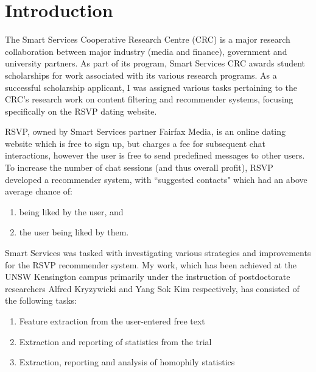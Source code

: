 \documentclass{report}
\begin{document}
\maketitle
\tableofcontents

\chapter{Introduction}

The Smart Services Cooperative Research Centre (CRC) is a major research collaboration between major industry (media and finance), government and university partners. As part of its program, Smart Services CRC awards student scholarships for work associated with its various research programs. As a successful scholarship applicant, I was assigned various tasks pertaining to the CRC's research work on content filtering and recommender systems, focusing specifically on the RSVP dating website.

RSVP, owned by Smart Services partner Fairfax Media, is an online dating website which is free to sign up, but charges a fee for subsequent chat interactions, however the user is free to send predefined messages to other users. To increase the number of chat sessions (and thus overall profit), RSVP developed a recommender system, with ``suggested contacts" which had an above average chance of:
\begin{enumerate}
  \item being liked by the user, and
  \item the user being liked by them.
\end{enumerate}

Smart Services was tasked with investigating various strategies and improvements for the RSVP recommender system. My work, which has been achieved at the UNSW Kensington campus primarily under the instruction of postdoctorate researchers Alfred Kryzywicki and Yang Sok Kim respectively, has consisted of the following tasks:
\begin{enumerate}
  \item Feature extraction from the user-entered free text
  \item Extraction and reporting of statistics from the trial
  \item Extraction, reporting and analysis of homophily statistics
\end{enumerate}
\end{document}
